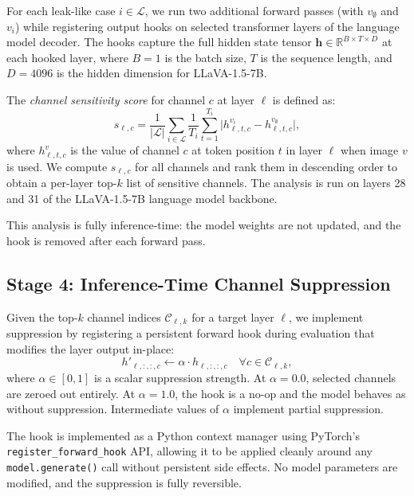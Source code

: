 \documentclass[12pt, a4paper]{article}
\begin{document}
For each leak-like case $i \in \mathcal{L}$, we run two additional forward passes
(with $v_{\emptyset}$ and $v_i$) while registering output hooks on selected transformer
layers of the language model decoder.
The hooks capture the full hidden state tensor $\mathbf{h} \in \mathbb{R}^{B \times T \times D}$
at each hooked layer, where $B = 1$ is the batch size, $T$ is the sequence length,
and $D = 4096$ is the hidden dimension for LLaVA-1.5-7B.

The \emph{channel sensitivity score} for channel $c$ at layer $\ell$ is defined as:
\begin{equation}
  s_{\ell, c} = \frac{1}{|\mathcal{L}|} \sum_{i \in \mathcal{L}}
    \frac{1}{T_i} \sum_{t=1}^{T_i}
    \bigl| h^{v_i}_{\ell, t, c} - h^{v_{\emptyset}}_{\ell, t, c} \bigr|,
  \label{eq:sensitivity}
\end{equation}
where $h^v_{\ell, t, c}$ is the value of channel $c$ at token position $t$ in layer
$\ell$ when image $v$ is used.
We compute $s_{\ell, c}$ for all channels and rank them in descending order to obtain
a per-layer top-$k$ list of sensitive channels.
The analysis is run on layers 28 and 31 of the LLaVA-1.5-7B language model backbone.

This analysis is fully inference-time: the model weights are not updated, and the hook
is removed after each forward pass.

\subsection{Stage 4: Inference-Time Channel Suppression}

Given the top-$k$ channel indices $\mathcal{C}_{\ell,k}$ for a target layer $\ell$,
we implement suppression by registering a persistent forward hook during evaluation
that modifies the layer output in-place:
\begin{equation}
  h'_{\ell, :, :, c} \leftarrow \alpha \cdot h_{\ell, :, :, c}
  \quad \forall c \in \mathcal{C}_{\ell, k},
  \label{eq:suppression}
\end{equation}
where $\alpha \in [0, 1]$ is a scalar suppression strength.
At $\alpha = 0.0$, selected channels are zeroed out entirely.
At $\alpha = 1.0$, the hook is a no-op and the model behaves as without suppression.
Intermediate values of $\alpha$ implement partial suppression.

The hook is implemented as a Python context manager using PyTorch's
\texttt{register\_forward\_hook} API, allowing it to be applied cleanly around any
\texttt{model.generate()} call without persistent side effects.
No model parameters are modified, and the suppression is fully reversible.
\end{document}
